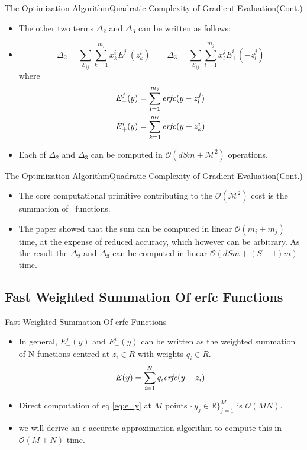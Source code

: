 \documentclass[8pt]{beamer}
\renewcommand{\|}[1][.3em]{\hspace{#1}|\hspace{#1}}
\renewcommand{\,}[1][.3em]{,\hspace{#1}}
\newlength{\wideitemsep}
\let\olditem\item
\renewcommand{\item}{\setlength{\itemsep}{\wideitemsep}\olditem}
\newcommand{\m}[1]{\mathcal{#1}}
\renewcommand{\,}{,\hspace{3pt}}
\renewcommand{\|}{\hspace{3pt}|\hspace{3pt}}
\newcommand{\erfc}{{\text{\textit{erfc}}}}
\renewcommand{\O}{\m{O}}
\newcommand{\eacc}{$\epsilon$-accurate }
\begin{document}
\begin{frame}{The Optimization Algorithm}{Quadratic Complexity of Gradient Evaluation(Cont.)}
    \begin{itemize}
    \item The other two terms $\Delta_2 $ and $\Delta_3$ can be written as follows:
    \item[] \begin{equation}
    \Delta_2 = \sum_{\m{E}_{ij}}\sum_{k = 1}^{m_i} x_k^iE_{-}^j(z_k^i)\hspace{2em}
    \Delta_3 = \sum_{\m{E}_{ij}}\sum_{l = 1}^{m_j} x_l^jE_{+}^i(-z_l^j)
    \end{equation}     
    where
    \begin{align}
    \begin{split}
    E_{-}^j(y) &= \sum_{l = 1}^{m_j}\erfc(y - z_l^j)\\
    E_{+}^i(y) &= \sum_{k = 1}^{m_i}\erfc(y + z_k^i)
    \end{split}
    \end{align}
    \item Each of $\Delta_2 $ and $\Delta_3$ can be computed in $\O(dSm + \m{M}^2)$ operations.
    \end{itemize}
\end{frame}

\begin{frame}{The Optimization Algorithm}{Quadratic Complexity of Gradient Evaluation(Cont.)}
    \begin{itemize}
    \item The core computational primitive contributing to the $\O(\m{M}^2)$ cost is the summation of \erfc\  functions.
    \item The paper showed that the sum can be computed in linear $\O(m_i + m_j)$ time, at the expense of reduced accuracy, which however can be arbitrary. As the result the $\Delta_2 $ and $\Delta_3$ can be computed in linear $\O(dSm + (S-1)m)$ time.
    \end{itemize}
\end{frame}

\subsection{Fast Weighted Summation Of erfc Functions}

\begin{frame}{Fast Weighted Summation Of erfc Functions}
    \begin{itemize}
    \item In general, $E_{-}^j(y)$ and $E_{+}^i(y)$  can be written as the weighted summation of N \erfc functions centred at $z_i \in R$ with weights $q_i \in R$.
    \begin{equation}
    E(y) = \sum_{i = 1}^Nq_i\erfc(y - z_i)\label{eq:e_y}
    \end{equation}
    \item Direct computation of eq.\ref{eq:e_y} at $M$ points $\{y_j \in \mathbb{R}\}_{j = 1}^M$ is $\O(MN)$.
    \item we will derive an \eacc approximation algorithm to compute this in $\O(M + N)$ time.
    \end{itemize}
\end{frame}
\end{document}
